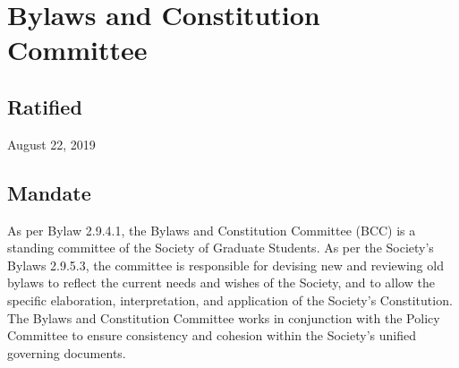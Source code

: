 \section{Bylaws and Constitution Committee}

\subsection{Ratified}
August 22, 2019

\subsection{Mandate}
As per Bylaw 2.9.4.1, the Bylaws and Constitution Committee (BCC) is a standing committee of the Society of Graduate Students. As per the Society's Bylaws 2.9.5.3, the committee is responsible for devising new and reviewing old bylaws to reflect the current needs and wishes of the Society, and to allow the specific elaboration, interpretation, and application of the Society's Constitution. The Bylaws and Constitution Committee works in conjunction with the Policy Committee to ensure consistency and cohesion within the Society's unified governing documents.

